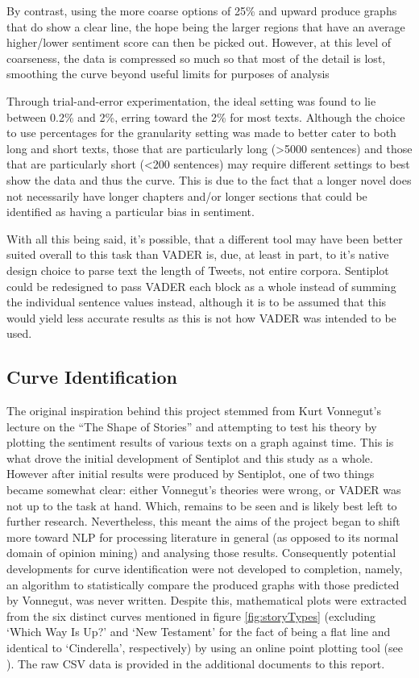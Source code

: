 \documentclass{article}
\begin{document}
        By contrast, using the more coarse options of 25\% and upward produce graphs that do show a clear line, the hope being the larger regions that have an average higher/lower sentiment score can then be picked out. However, at this level of coarseness, the data is compressed so much so that most of the detail is lost, smoothing the curve beyond useful limits for purposes of analysis

        Through trial-and-error experimentation, the ideal setting was found to lie between 0.2\% and 2\%, erring toward the 2\% for most texts. Although the choice to use percentages for the granularity setting was made to better cater to both long and short texts, those that are particularly long (>5000 sentences) and those that are particularly short (<200 sentences) may require different settings to best show the data and thus the curve. This is due to the fact that a longer novel does not necessarily have longer chapters and/or longer sections that could be identified as having a particular bias in sentiment.
        
        With all this being said, it's possible, that a different tool may have been better suited overall to this task than VADER is, due, at least in part, to it's native design choice to parse text the length of Tweets, not entire corpora. Sentiplot could be redesigned to pass VADER each block as a whole instead of summing the individual sentence values instead, although it is to be assumed that this would yield less accurate results as this is not how VADER was intended to be used.
    \subsection{Curve Identification}
        The original inspiration behind this project stemmed from Kurt Vonnegut's lecture on the ``The Shape of Stories'' and attempting to test his theory by plotting the sentiment results of various texts on a graph against time. This is what drove the initial development of Sentiplot and this study as a whole. However after initial results were produced by Sentiplot, one of two things became somewhat clear: either Vonnegut's theories were wrong, or VADER was not up to the task at hand. Which, remains to be seen and is likely best left to further research. Nevertheless, this meant the aims of the project began to shift more toward NLP for processing literature in general (as opposed to its normal domain of opinion mining) and analysing those results. Consequently potential developments for curve identification were not developed to completion, namely, an algorithm to statistically compare the produced graphs with those predicted by Vonnegut, was never written. Despite this, mathematical plots were extracted from the six distinct curves mentioned in figure \ref{fig:storyTypes} (excluding `Which Way Is Up?' and `New Testament' for the fact of being a flat line and identical to `Cinderella', respectively) by using an online point plotting tool (see \cite{webPlotDigitizer}). The raw CSV data is provided in the additional documents to this report.
\end{document}
